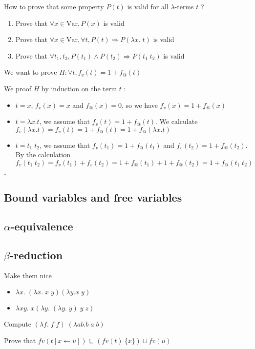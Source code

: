 \documentclass{article}
\theoremstyle{plain}
\theoremstyle{plain}
\renewcommand\qedsymbol{$\square$}
\begin{document}
  How to prove that some property $P(t)$ is valid for all $\lambda$-terms $t$ ?

  \begin{enumerate}
    \item Prove that $\forall x \in \text{Var}, P(x)$ is valid
    \item Prove that $\forall x \in \text{Var}, \forall t, P(t) \Rightarrow
      P(\lambda x.\; t)$ is valid
    \item Prove that $\forall t_1, t_2, P(t_1) \wedge P(t_2) \Rightarrow P(t_1
      \; t_2)$ is valid
  \end{enumerate}

  \exam We want to prove $H : \forall t, f_v(t) = 1 + f_@(t) $

  \proof We proof $H$ by induction on the term $t$ :

  \begin{itemize}
    \item $t = x$, $f_v(x) = x$ and $f_@(x) = 0$, so we have $f_v(x) = 1 +
      f_@(x)$

    \item $t = \lambda x. t$, we assume that $f_v(t) = 1 + f_@(t)$.
      We calculate $f_v(\lambda x. t) = f_v(t) = 1 + f_@(t) = 1 + f_@(\lambda
      x.t)$

    \item $t = t_1\; t_2$, we assume that $f_v(t_1) = 1 + f_@(t_1)$ and
      $f_v(t_2) = 1 + f_@(t_2)$. By the calculation $f_v(t_1\; t_2) = f_v(t_1) +
      f_v(t_2) = 1 + f_@(t_1) + 1 + f_@(t_2) = 1 + f_@(t_1\; t_2)$
  \end{itemize}
  \qedsymbol

  \subsection{Bound variables and free variables}

  \subsection{$\alpha$-equivalence}

  \subsection{$\beta$-reduction}

  \exam Make them nice
    \begin{itemize} 
      \item $\lambda x.\; (\lambda x.\; x\; y) (\lambda y. x\; y)$
      \item $\lambda x y.\; x (\lambda y.\; (\lambda y.\; y)\; y\; z)$
    \end{itemize}

  \exam Compute $(\lambda f.\; f\;f)\; (\lambda a b. b\;a\;b)$

  \exam Prove that $fv(t[x \leftarrow u]) \subseteq (fv(t) \ \{x\}) \cup fv(u)$
\end{document}
